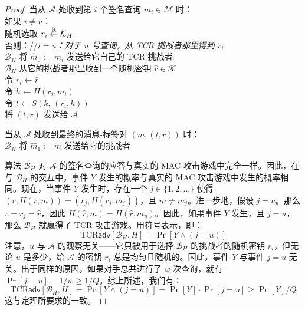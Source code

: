 \begin{proof}
\hspace*{5pt} 当从 $\mathcal{A}$ 处收到第 $i$ 个签名查询 $m_i\in\mathcal{M}$ 时：\\
\hspace*{50pt} 如果 $i\neq u$：\\
\hspace*{75pt} 随机选取 $r_i\overset{\rm R}\leftarrow\mathcal{K}_H$\\
\hspace*{50pt} 否则：\quad //\quad\emph{$i=u$：对于 $u$ 号查询，从 TCR 挑战者那里得到 $r_i$} \\
\hspace*{75pt} $\mathcal{B}_H$ 将 $\hat{m}_0:=m_i$ 发送给它自己的 TCR 挑战者\\
\hspace*{75pt} $\mathcal{B}_H$ 从它的挑战者那里收到一个随机密钥 $\hat{r}\in\mathcal{K}$\\
\hspace*{75pt} 令 $r_i\leftarrow\hat{r}$\\
\hspace*{50pt} 令 $h\leftarrow H(r_i,m_i)$\\
\hspace*{50pt} 令 $t\leftarrow S(k,\,(r_i,h))$\\
\hspace*{50pt} 将 $(t,r)$ 发送给 $\mathcal{A}$

\vspace{5pt}

\hspace*{5pt} 当从 $\mathcal{A}$ 处收到最终的消息-标签对 $(m,(t,r))$ 时：\\
\hspace*{50pt} $\mathcal{B}_H$ 将 $\hat{m}_1:=m$ 发送给它的挑战者

\vspace{5pt}

算法 $\mathcal{B}_H$ 对 $\mathcal{A}$ 的签名查询的应答与真实的 MAC 攻击游戏中完全一样。因此，在与 $\mathcal{B}_H$ 的交互中，事件 $Y$ 发生的概率与真实的 MAC 攻击游戏中发生的概率相同。现在，当事件 $Y$ 发生时，存在一个 $j\in\{1,2,\dots\}$ 使得 $(r,H(r,m))=(r_j,H(r_j,m_j))$，且 $m\neq m_j$。进一步地，假设 $j=u$。那么$r=r_j=\hat{r}$，因此 $H(\hat{r},m)=H(\hat{r},m_u)$。因此，如果事件 $Y$ 发生，且 $j=u$，那么 $\mathcal{B}_H$ 就赢得了 TCR 攻击游戏。用符号表示，即：
\[
\mathrm{TCR}\mathsf{adv}[\mathcal{B}_H,H]=\Pr[Y\land(j=u)]
\]
注意，$u$ 与 $\mathcal{A}$ 的观察无关——它只被用于选择 $\mathcal{B}_H$ 的挑战者的随机密钥 $r_i$，但无论 $u$ 是多少，给 $\mathcal{A}$ 的密钥 $r_i$ 总是均匀且随机的。因此，事件 $Y$ 与事件 $j=u$ 无关。出于同样的原因，如果对手总共进行了 $w$ 次查询，就有 $\Pr[j=u]=1/w\geq 1/Q$。综上所述，我们有：
\[
\mathrm{TCR}\mathsf{adv}[\mathcal{B}_H,H]=
\Pr[Y\land(j=u)]
=\Pr[Y]\cdot\Pr[j=u]
\geq\Pr[Y]/Q
\]
这与定理所要求的一致。
\end{proof}